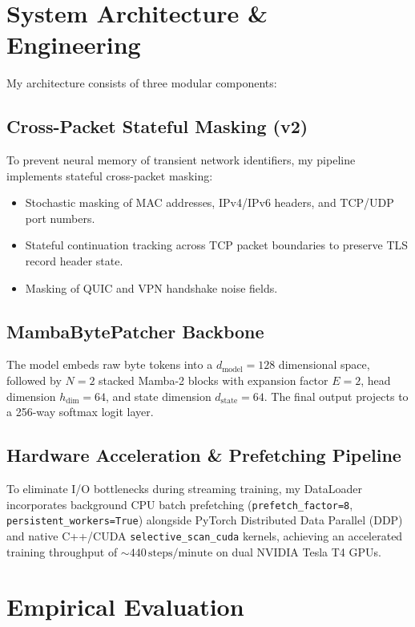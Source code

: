\documentclass[10pt,journal,compsoc]{IEEEtran}
\begin{document}
\section{System Architecture \& Engineering}

My architecture consists of three modular components:

\subsection{Cross-Packet Stateful Masking (v2)}
To prevent neural memory of transient network identifiers, my pipeline implements stateful cross-packet masking:
\begin{itemize}
    \item Stochastic masking of MAC addresses, IPv4/IPv6 headers, and TCP/UDP port numbers.
    \item Stateful continuation tracking across TCP packet boundaries to preserve TLS record header state.
    \item Masking of QUIC and VPN handshake noise fields.
\end{itemize}

\subsection{MambaBytePatcher Backbone}
The model embeds raw byte tokens into a $d_{\text{model}} = 128$ dimensional space, followed by $N=2$ stacked Mamba-2 blocks with expansion factor $E=2$, head dimension $h_{\text{dim}}=64$, and state dimension $d_{\text{state}}=64$. The final output projects to a 256-way softmax logit layer.

\subsection{Hardware Acceleration & Prefetching Pipeline}
To eliminate I/O bottlenecks during streaming training, my DataLoader incorporates background CPU batch prefetching (\texttt{prefetch\_factor=8}, \texttt{persistent\_workers=True}) alongside PyTorch Distributed Data Parallel (DDP) and native C++/CUDA \texttt{selective\_scan\_cuda} kernels, achieving an accelerated training throughput of $\sim 440\,\text{steps/minute}$ on dual NVIDIA Tesla T4 GPUs.

\section{Empirical Evaluation}
\label{sec:eval}
\end{document}
